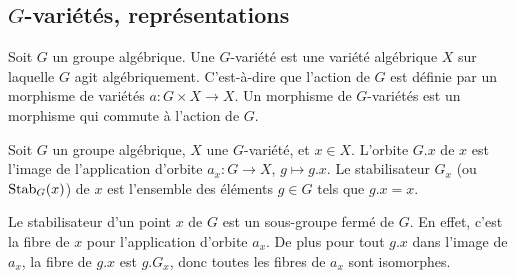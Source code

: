 \subsection{$G$-variétés, représentations}

\begin{defn}[$G$-variété]
Soit $G$ un groupe algébrique. Une $G$-variété est une variété algébrique $X$ sur laquelle $G$ agit algébriquement. C'est-à-dire que l'action de $G$ est définie par un morphisme de variétés $a:G\times X\rightarrow X$. Un morphisme de $G$-variétés est un morphisme qui commute à l'action de $G$. 
\end{defn}

\begin{defn}
Soit $G$ un groupe algébrique, $X$ une $G$-variété, et $x\in X$. L'orbite $G.x$ de $x$ est l'image de l'application d'orbite $a_x:G\rightarrow X$, $g\mapsto g.x$. Le stabilisateur $G_x$ (ou $\operatorname{Stab}_G(x)$) de $x$ est l'ensemble des éléments $g\in G$ tels que $g.x=x$.  
\end{defn}

Le stabilisateur d'un point $x$ de $G$ est un sous-groupe fermé de $G$. En effet, c'est la fibre de $x$ pour l'application d'orbite $a_x$. De plus pour tout $g.x$ dans l'image de $a_x$, la fibre de $g.x$ est $g.G_x$, donc toutes les fibres de $a_x$ sont isomorphes.

